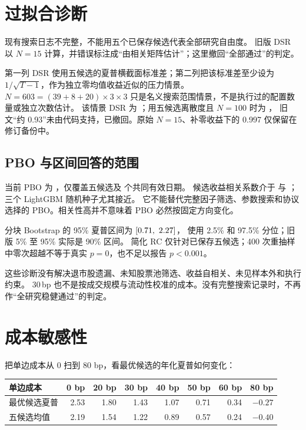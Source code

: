 \section{过拟合诊断}

现有搜索日志不完整，不能用五个已保存候选代表全部研究自由度。
旧版 DSR 以 $N=15$ 计算，并错误标注成“由相关矩阵估计”；这里撤回“全部通过”的判定。

\begin{center}\small

\end{center}

第一列 DSR 使用五候选的夏普横截面标准差；第二列把该标准差至少设为
$1/\sqrt{T-1}$，作为独立零均值收益近似的压力情景。
$N=603=(39+8+20)\times3\times3$ 只是名义搜索范围情景，不是执行过的配置数量或独立次数估计。
该情景 DSR 为 \AuditDSRStress{}；用五候选离散度且 $N=100$ 时为 \AuditDSRHundred{}，
旧文“约 0.93”未由代码支持，已撤回。原始 $N=15$、补零收益下的 0.997 仅保留在修订备份中。

\subsection{PBO 与区间回答的范围}
当前 PBO 为 \AuditPBO{}，仅覆盖五候选及 \AuditCommonN{} 个共同有效日期。
候选收益相关系数介于 \AuditCorrMin{} 与 \AuditCorrMax{}；三个 LightGBM 随机种子尤其接近。
它不能替代完整因子筛选、参数搜索和协议选择的 PBO。相关性高并不意味着 PBO 必然按固定方向变化。

分块 Bootstrap 的 95\% 夏普区间为 $[0.71,\ 2.27]$，
使用 2.5\% 和 97.5\% 分位；旧版 5\% 至 95\% 实际是 90\% 区间。
简化 RC 仅针对已保存五候选；400 次重抽样中零次超越不等于真实 $p=0$，也不足以报告 $p<0.001$。

\begin{warnbox}[历史内部验证不能代替前瞻证据]
这些诊断没有解决退市股遗漏、未知股票池筛选、收益自相关、未见样本外和执行约束。
30\,bp 也不是按成交规模与流动性校准的成本。没有完整搜索记录时，不再作“全研究稳健通过”的判定。
\end{warnbox}

\section{成本敏感性}

把单边成本从 0 扫到 80 bp，看最优候选的年化夏普如何变化：

\begin{center}
\begin{tabular}{@{}lrrrrrrr@{}}
\toprule
单边成本 & 0 bp & 20 bp & 30 bp & 40 bp & 50 bp & 60 bp & 80 bp \\
\midrule
最优候选夏普 & 2.53 & 1.80 & 1.43 & 1.07 & 0.71 & 0.34 & $-0.27$ \\
五候选均值 & 2.19 & 1.54 & 1.22 & 0.89 & 0.57 & 0.24 & $-0.40$ \\
\bottomrule
\end{tabular}
\end{center}

